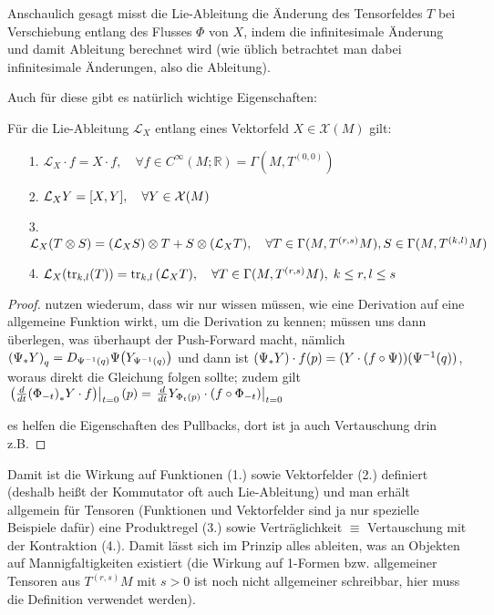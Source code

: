 \documentclass[../H_Analysis_main.tex]{subfiles}
\begin{document}
Anschaulich gesagt misst die Lie-Ableitung die Änderung des Tensorfeldes $T$ bei Verschiebung entlang des Flusses $\Phi$ von $X$, indem die infinitesimale Änderung und damit Ableitung berechnet wird (wie üblich betrachtet man dabei infinitesimale Änderungen, also die Ableitung).

Auch für diese gibt es natürlich wichtige Eigenschaften:
\begin{satz}\label{satz:lieableigsch}
Für die Lie-Ableitung $\mathcal{L}_X$ entlang eines Vektorfeld $X \in \mathcal{X}(M)$ gilt:
\begin{itemize}
\item[1.] $\mathcal{L}_X \cdot f = X \cdot f, \quad \forall f \in C^\infty(M; \mathbb{R}) = \Gamma(M, T^{(0, 0)})$

\item[2.] $\mathcal{L}_X Y = \qty[X, Y], \quad \forall Y \in \mathcal{X}(M)$

\item[3.] $\mathcal{L}_X\qty(T \otimes S) = \qty(\mathcal{L}_X S) \otimes T + S \otimes \qty(\mathcal{L}_X T), \quad \forall T \in \Gamma(M, T^{(r, s)}M), S \in \Gamma(M, T^{(k, l)}M)$

\item[4.] $\mathcal{L}_X\qty(\tr_{k, l}(T)) = \tr_{k, l}\qty(\mathcal{L}_X T), \quad \forall T \in \Gamma(M, T^{(r, s)}M), \; k \leq r, l \leq s$
\end{itemize}
\end{satz}
\begin{proof}
nutzen wiederum, dass wir nur wissen müssen, wie eine Derivation auf eine allgemeine Funktion wirkt, um die Derivation zu kennen; müssen uns dann überlegen, was überhaupt der Push-Forward macht, nämlich $\qty(\Psi_* Y)_q = D_{\Psi^{-1}(q)} \Psi \qty(Y_{\Psi^{-1}(q)})$ und dann ist $\qty(\Psi_* Y) \cdot f (p) = \qty(Y \cdot \qty(f \circ \Psi))(\Psi^{-1}(q))$, woraus direkt die Gleichung folgen sollte; zudem gilt $\eval{\qty(\dv{t} \qty(\Phi_{-t})_* Y \cdot f)}_{t = 0}(p) = \eval{\dv{t} Y_{\Phi_t(p)} \cdot \qty(f \circ \Phi_{-t})}_{t = 0}$

es helfen die Eigenschaften des Pullbacks, dort ist ja auch Vertauschung drin z.B.
\end{proof}

Damit ist die Wirkung auf Funktionen (1.) sowie Vektorfelder (2.) definiert (deshalb heißt der Kommutator oft auch Lie-Ableitung) und man erhält allgemein für Tensoren (Funktionen und Vektorfelder sind ja nur spezielle Beispiele dafür) eine Produktregel (3.) sowie Verträglichkeit $\equiv$ Vertauschung mit der Kontraktion (4.). Damit lässt sich im Prinzip alles ableiten, was an Objekten auf Mannigfaltigkeiten existiert (die Wirkung auf 1-Formen bzw. allgemeiner Tensoren aus $T^{(r, s)}M$ mit $s > 0$ ist noch nicht allgemeiner schreibbar, hier muss die Definition verwendet werden).
\end{document}
